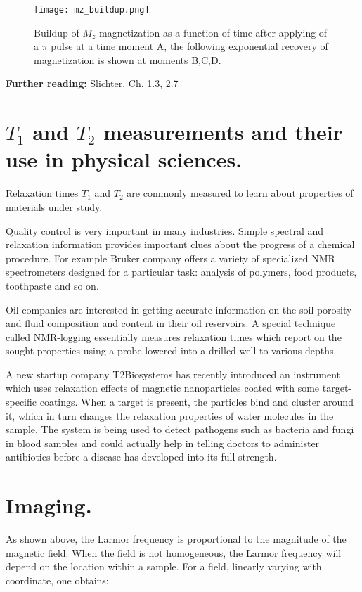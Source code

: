\documentclass[a4paper, 12pt]{article}
\begin{document}
\begin{figure}[ht]
\caption{Buildup of $M_z$ magnetization as a function of time after applying of a $\pi$ pulse at a time moment A, the following exponential recovery of magnetization is shown at moments B,C,D.}
\label{fig:mz_buildup}
\centering
\texttt{[image: mz\_buildup.png]}
\end{figure}

\textbf{Further reading:} Slichter, Ch. 1.3, 2.7


\section{$T_1$ and $T_2$ measurements and their use in physical sciences.}
  Relaxation times  $T_1$ and $T_2$ are commonly measured to learn about properties of materials under study. 
  
  Quality control is very important in many industries. Simple spectral and relaxation information provides important clues about the progress of a chemical procedure. For example Bruker company offers a variety of specialized NMR spectrometers designed for a particular task: analysis of polymers, food products, toothpaste and so on.
  
  Oil companies are  interested in getting accurate information on the soil porosity and fluid composition and content in their oil reservoirs. A special technique called NMR-logging essentially measures relaxation times which report on the sought properties using a probe lowered into a drilled well to various depths.
  
 A new startup company T2Biosystems has recently introduced an instrument which uses relaxation effects of magnetic nanoparticles coated with some target-specific coatings. When a target is present, the particles bind and cluster around it, which in turn changes the relaxation properties of water molecules in the sample. The system is being used to detect pathogens such as bacteria and fungi in blood samples and could actually help in telling doctors to administer antibiotics before a disease has developed into its full strength.
 
\section{Imaging.}

 As shown above, the Larmor frequency is proportional to the magnitude of the magnetic field. When the field is not homogeneous, the Larmor frequency will depend on the location within a sample. For a field, linearly varying with coordinate, one obtains:
 
\end{document}
